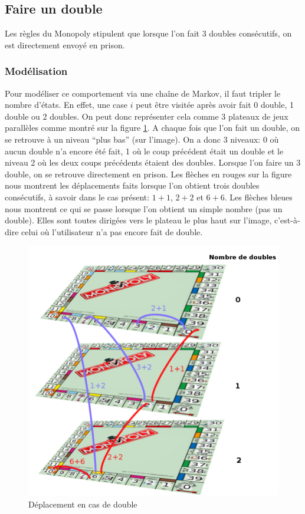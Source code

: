 \documentclass[letterpaper]{article}
\begin{document}
  \subsection{Faire un double}
    Les règles du Monopoly stipulent que lorsque l'on fait 3 doubles 
    consécutifs, on est directement envoyé en prison.
    \subsubsection{Modélisation}
      \label{modelisation_double}
      Pour modéliser ce comportement via une 
      chaîne de Markov, il faut tripler le nombre d'états.  En effet, une case 
      $i$ peut être visitée après avoir fait 0 double, 1 double ou 2 doubles.  
      On peut donc représenter cela comme 3 plateaux de jeux parallèles comme
      montré sur la figure \ref{representation_double}.  A chaque fois que l'on
      fait un double, on se retrouve à un niveau ``plus bas'' (sur l'image).  
      On a donc 3 niveaux: 0 où aucun double n'a encore été fait, 1 où le coup 
      précédent était un double et le niveau 2 où les deux coups précédents 
      étaient des doubles. Lorsque l'on faire un 3 double, on se 
      retrouve directement en prison.  Les flèches en rouges sur la figure nous 
      montrent les déplacements faits lorsque l'on obtient trois doubles 
      consécutifs, à savoir dans le cas présent: $1+1$, $2+2$ et $6+6$.  Les 
      flèches bleues nous montrent ce qui se passe lorsque l'on obtient un 
      simple nombre (pas un double).  Elles sont toutes dirigées vers le 
      plateau le plus haut sur l'image, c'est-à-dire celui où l'utilisateur 
      n'a pas encore fait de double.
      \begin{figure}[h]
	\centering
	\includegraphics[scale=0.4]{./Images/MonopolyVertical_legende.png}
	  \caption{Déplacement en cas de double}
	  \label{representation_double}
      \end{figure}
\end{document}
